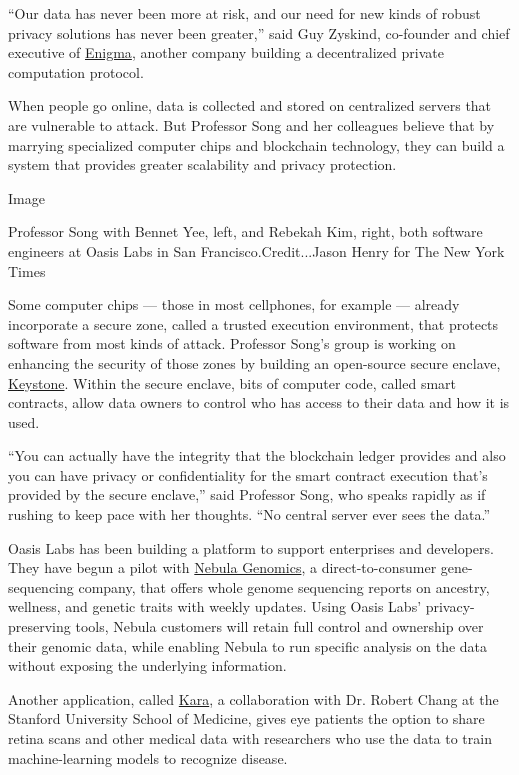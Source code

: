 ``Our data has never been more at risk, and our need for new kinds of
robust privacy solutions has never been greater,'' said Guy Zyskind,
co-founder and chief executive of \href{https://enigma.co/}{Enigma},
another company building a decentralized private computation protocol.

When people go online, data is collected and stored on centralized
servers that are vulnerable to attack. But Professor Song and her
colleagues believe that by marrying specialized computer chips and
blockchain technology, they can build a system that provides greater
scalability and privacy protection.

Image

Professor Song with Bennet Yee, left, and Rebekah Kim, right, both
software engineers at Oasis Labs in San Francisco.Credit...Jason Henry
for The New York Times

Some computer chips --- those in most cellphones, for example ---
already incorporate a secure zone, called a trusted execution
environment, that protects software from most kinds of attack. Professor
Song's group is working on enhancing the security of those zones by
building an open-source secure enclave,
\href{https://keystone-enclave.org/}{Keystone}. Within the secure
enclave, bits of computer code, called smart contracts, allow data
owners to control who has access to their data and how it is used.

``You can actually have the integrity that the blockchain ledger
provides and also you can have privacy or confidentiality for the smart
contract execution that's provided by the secure enclave,'' said
Professor Song, who speaks rapidly as if rushing to keep pace with her
thoughts. ``No central server ever sees the data.''

Oasis Labs has been building a platform to support enterprises and
developers. They have begun a pilot with
\href{https://nebula.org/}{Nebula Genomics}, a direct-to-consumer
gene-sequencing company, that offers whole genome sequencing reports on
ancestry, wellness, and genetic traits with weekly updates. Using Oasis
Labs' privacy-preserving tools, Nebula customers will retain full
control and ownership over their genomic data, while enabling Nebula to
run specific analysis on the data without exposing the underlying
information.

Another application, called \href{https://kara.cloud/\#/}{Kara}, a
collaboration with Dr. Robert Chang at the Stanford University School of
Medicine, gives eye patients the option to share retina scans and other
medical data with researchers who use the data to train machine-learning
models to recognize disease.

